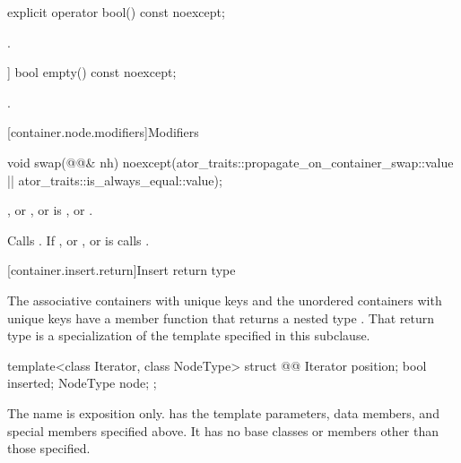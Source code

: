 \begin{itemdecl}
explicit operator bool() const noexcept;
\end{itemdecl}

\begin{itemdescr}
\pnum
\returns {}.
\end{itemdescr}

\begin{itemdecl}
[[nodiscard]] bool empty() const noexcept;
\end{itemdecl}

\begin{itemdescr}
\pnum
\returns {}.
\end{itemdescr}

[container.node.modifiers]{Modifiers}

\begin{itemdecl}
void swap(@@& nh)
  noexcept(ator_traits::propagate_on_container_swap::value ||
           ator_traits::is_always_equal::value);
\end{itemdecl}

\begin{itemdescr}
\pnum
\requires {}, or , or
 is ,
or .

\pnum
\effects Calls . If , or
, or 
is  calls .
\end{itemdescr}

[container.insert.return]{Insert return type}

\pnum
The associative containers with unique keys and the unordered containers with unique keys
have a member function  that returns a nested type .
That return type is a specialization of the template specified in this subclause.

\begin{codeblock}
template<class Iterator, class NodeType>
struct @@
{
  Iterator position;
  bool     inserted;
  NodeType node;
};
\end{codeblock}

\pnum
The name  is exposition only.
 has the template parameters,
data members, and special members specified above.
It has no base classes or members other than those specified.

